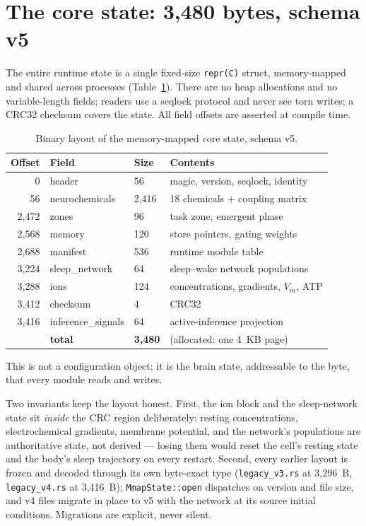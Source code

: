 \documentclass[11pt]{article}
\newcommand{\code}[1]{\texttt{\small #1}}
\begin{document}
\section{The core state: 3,480 bytes, schema v5}

The entire runtime state is a single fixed-size \code{repr(C)} struct,
memory-mapped and shared across processes (Table~\ref{tab:layout}).
There are no heap allocations and no variable-length fields; readers
use a seqlock protocol and never see torn writes; a CRC32 checksum
covers the state. All field offsets are asserted at compile time.

\begin{table}[h]
\centering
\begin{tabular}{@{}rllp{5.2cm}@{}}
\toprule
Offset & Field & Size & Contents \\
\midrule
0     & header              & 56     & magic, version, seqlock, identity \\
56    & neurochemicals      & 2{,}416 & 18 chemicals + coupling matrix \\
2{,}472 & zones             & 96     & task zone, emergent phase \\
2{,}568 & memory            & 120    & store pointers, gating weights \\
2{,}688 & manifest          & 536    & runtime module table \\
3{,}224 & sleep\_network    & 64     & sleep--wake network populations \\
3{,}288 & ions              & 124    & concentrations, gradients, $V_m$, ATP \\
3{,}412 & checksum          & 4      & CRC32 \\
3{,}416 & inference\_signals & 64    & active-inference projection \\
\midrule
 & \textbf{total} & \textbf{3{,}480} & (allocated: one 4~KB page) \\
\bottomrule
\end{tabular}
\caption{Binary layout of the memory-mapped core state, schema v5.}
\label{tab:layout}
\end{table}

This is not a configuration object; it is the brain state, addressable
to the byte, that every module reads and writes.

Two invariants keep the layout honest. First, the ion block and the
sleep-network state sit \emph{inside} the CRC region deliberately:
resting concentrations, electrochemical gradients, membrane potential,
and the network's populations are authoritative state, not derived ---
losing them would reset the cell's resting state and the body's sleep
trajectory on every restart. Second, every earlier layout is frozen and
decoded through its own byte-exact type (\code{legacy\_v3.rs} at
3{,}296~B, \code{legacy\_v4.rs} at 3{,}416~B); \code{MmapState::open}
dispatches on version and file size, and v4 files migrate in place to
v5 with the network at its source initial conditions. Migrations are
explicit, never silent.
\end{document}
